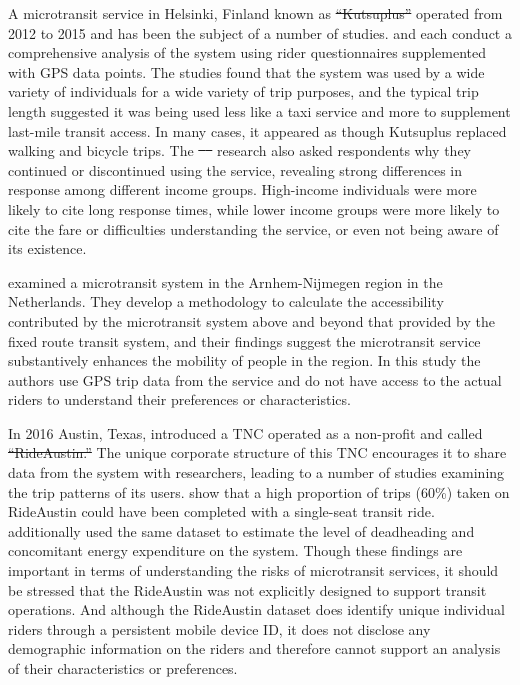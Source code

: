\documentclass[smartcities,article,submit,moreauthors,pdftex]{mdpi} %
\providecommand{\DIFadd}[1]{{\protect\color{blue}\uwave{#1}}} %
\providecommand{\DIFdel}[1]{{\protect\color{red}\sout{#1}}}                      %
\providecommand{\DIFaddbegin}{} %
\providecommand{\DIFaddend}{} %
\providecommand{\DIFdelbegin}{} %
\providecommand{\DIFdelend}{} %
\begin{document}
A microtransit service in Helsinki, Finland known as \DIFdelbegin \DIFdel{“Kutsuplus” }\DIFdelend \DIFaddbegin \DIFadd{``Kutsuplus'' }\DIFaddend operated from
2012 to 2015 and has been the subject of a number of studies. \citet{weckstrom2018} and
\citet{Haglund2019} each conduct a comprehensive analysis of the system using rider
questionnaires supplemented with GPS data points. The studies found that the
system was used by a wide variety of individuals for a wide variety of trip
purposes, and the typical trip length suggested it was being used less like a
taxi service and more to supplement last-mile transit access. In many cases, it
appeared as though Kutsuplus replaced walking and bicycle trips. The
\DIFdelbegin \DIFdel{\mbox{%
\citeauthor{weckstrom2018} }\hspace{0pt}%
}\DIFdelend \DIFaddbegin \DIFadd{\mbox{%
\citet{weckstrom2018} }\hspace{0pt}%
}\DIFaddend research also asked respondents why they continued or
discontinued using the service, revealing strong differences in response among
different income groups. High-income individuals were more likely to cite long
response times, while lower income groups were more likely to cite the fare or
difficulties understanding the service, or even not being aware of its
existence.

\citet{alonso2018} examined a microtransit system in the Arnhem-Nijmegen region in the
Netherlands. They develop a methodology to calculate the accessibility
contributed by the microtransit system above and beyond that provided by the
fixed route transit system, and their findings suggest the microtransit
service substantively enhances the mobility of people in the region. In this
study the authors use GPS trip data from the service and do not have access to
the actual riders to understand their preferences or characteristics.

In 2016 Austin, Texas, introduced a TNC operated as a non-profit and called
\DIFdelbegin \DIFdel{“RideAustin.” }\DIFdelend \DIFaddbegin \DIFadd{``RideAustin.'' }\DIFaddend The unique corporate structure of this TNC encourages it to share
data from the system with researchers, leading to a number of studies examining
the trip patterns of its users. \citet{Komanduri2018} show that a high proportion of
trips (60\%) taken on RideAustin could have been completed with a single-seat
transit ride. \citet{Wenzel2019} additionally used the same dataset to estimate the
level of deadheading and concomitant energy expenditure on the system. Though
these findings are important in terms of understanding the risks of microtransit
services, it should be stressed that the RideAustin was not explicitly designed
to support transit operations. And although the RideAustin dataset does identify
unique individual riders through a persistent mobile device ID, it does not
disclose any demographic information on the riders and therefore cannot support
an analysis of their characteristics or preferences.
\end{document}
